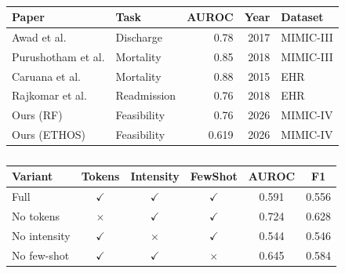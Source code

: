 \begin{table}[h]
\begin{englishblock}
\centering
\caption{}
\begin{tabular}{llrrl}
\toprule
Paper & Task & AUROC & Year & Dataset \\
\midrule
Awad et al. & Discharge & 0.78 & 2017 & MIMIC-III \\
Purushotham et al. & Mortality & 0.85 & 2018 & MIMIC-III \\
Caruana et al. & Mortality & 0.88 & 2015 & EHR \\
Rajkomar et al. & Readmission & 0.76 & 2018 & EHR \\
Ours (RF) & Feasibility & 0.76 & 2026 & MIMIC-IV \\
Ours (ETHOS) & Feasibility & 0.619 & 2026 & MIMIC-IV \\
\bottomrule
\end{tabular}
\label{tab:sota}
\end{englishblock}
\end{table}

\begin{table}[h]
\begin{englishblock}
\centering
\caption{}
\begin{tabular}{lccccc}
\toprule
Variant & Tokens & Intensity & FewShot & AUROC & F1 \\
\midrule
Full & $\checkmark$ & $\checkmark$ & $\checkmark$ & 0.591 & 0.556 \\
No tokens & $\times$ & $\checkmark$ & $\checkmark$ & 0.724 & 0.628 \\
No intensity & $\checkmark$ & $\times$ & $\checkmark$ & 0.544 & 0.546 \\
No few-shot & $\checkmark$ & $\checkmark$ & $\times$ & 0.645 & 0.584 \\
\bottomrule
\end{tabular}
\label{tab:ablation_matrix}
\end{englishblock}
\end{table}

